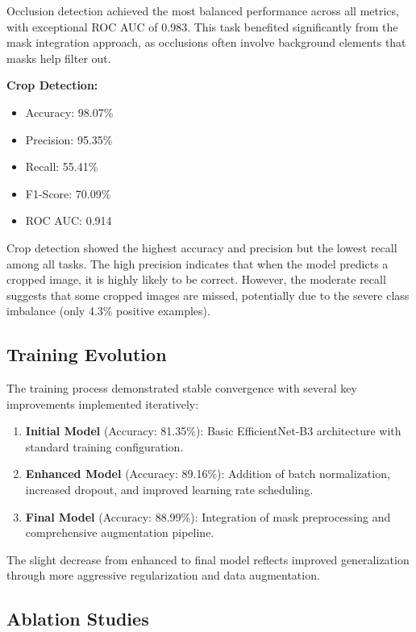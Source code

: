 \documentclass[12pt,twocolumn]{article}
\begin{document}
Occlusion detection achieved the most balanced performance across all metrics, with exceptional ROC AUC of 0.983. This task benefited significantly from the mask integration approach, as occlusions often involve background elements that masks help filter out.

\textbf{Crop Detection:}
\begin{itemize}
\item Accuracy: 98.07\%
\item Precision: 95.35\%
\item Recall: 55.41\%
\item F1-Score: 70.09\%
\item ROC AUC: 0.914
\end{itemize}

Crop detection showed the highest accuracy and precision but the lowest recall among all tasks. The high precision indicates that when the model predicts a cropped image, it is highly likely to be correct. However, the moderate recall suggests that some cropped images are missed, potentially due to the severe class imbalance (only 4.3\% positive examples).

\subsection{Training Evolution}

The training process demonstrated stable convergence with several key improvements implemented iteratively:

\begin{enumerate}
\item \textbf{Initial Model} (Accuracy: 81.35\%): Basic EfficientNet-B3 architecture with standard training configuration.
\item \textbf{Enhanced Model} (Accuracy: 89.16\%): Addition of batch normalization, increased dropout, and improved learning rate scheduling.
\item \textbf{Final Model} (Accuracy: 88.99\%): Integration of mask preprocessing and comprehensive augmentation pipeline.
\end{enumerate}

The slight decrease from enhanced to final model reflects improved generalization through more aggressive regularization and data augmentation.

\subsection{Ablation Studies}
\end{document}
